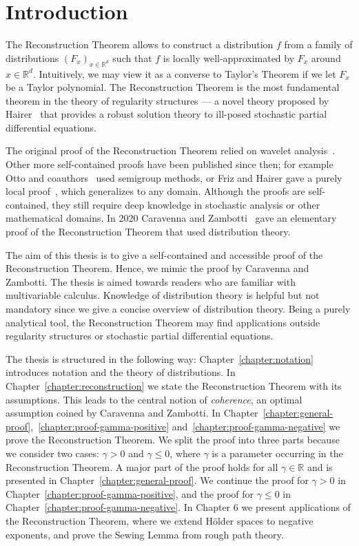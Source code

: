 \chapter{Introduction} 

The Reconstruction Theorem allows to construct a distribution \(f\) from a family of distributions \({(F_{x})}_{x \in \mathbb{R}^d}\) such that \(f\) is locally well-approximated by \(F_x\) around \(x \in \mathbb{R}^d\). Intuitively, we may view it as a converse to Taylor's Theorem if we let \(F_x\) be a Taylor polynomial. The Reconstruction Theorem is the most fundamental theorem in the theory of regularity structures --- a novel theory proposed by Hairer~\cite{hairer2014theory} that provides a robust solution theory to ill-posed stochastic partial differential equations.

The original proof of the Reconstruction Theorem relied on wavelet analysis~\cite{hairer2017reconstruction}. Other more self-contained proofs have been published since then; for example Otto and coauthors~\cite{otto2019quasilinear} used semigroup methods, or Friz and Hairer gave a purely local proof~\cite{friz2020course}, which generalizes to any domain. Although the proofs are self-contained, they still require deep knowledge in stochastic analysis or other mathematical domains. In 2020 Caravenna and Zambotti~\cite{caravenna2021hairer} gave an elementary proof of the Reconstruction Theorem that used distribution theory. 

The aim of this thesis is to give a self-contained and accessible proof of the Reconstruction Theorem. Hence, we mimic the proof by Caravenna and Zambotti. The thesis is aimed towards readers who are familiar with multivariable calculus. Knowledge of distribution theory is helpful but not mandatory since we give a concise overview of distribution theory.
Being a purely analytical tool, the Reconstruction Theorem may find applications outside regularity structures or stochastic partial differential equations. 

The thesis is structured in the following way: Chapter~\ref{chapter:notation} introduces notation and the theory of distributions. In Chapter~\ref{chapter:reconstruction} we state the Reconstruction Theorem with its assumptions. This leads to the central notion of \emph{coherence}, an optimal assumption coined by Caravenna and Zambotti. In Chapter~\ref{chapter:general-proof},~\ref{chapter:proof-gamma-positive} and~\ref{chapter:proof-gamma-negative} we prove the Reconstruction Theorem. We split the proof into three parts because we consider two cases: \(\gamma > 0\) and \(\gamma \leq 0\), where \({\gamma}\) is a parameter occurring in the Reconstruction Theorem. A major part of the proof holds for all \(\gamma \in \mathbb{R}\) and is presented in Chapter~\ref{chapter:general-proof}. We continue the proof for \(\gamma > 0\) in Chapter~\ref{chapter:proof-gamma-positive}, and the proof for \(\gamma \leq 0\) in Chapter~\ref{chapter:proof-gamma-negative}. In Chapter 6 we present applications of the Reconstruction Theorem, where we extend Hölder spaces to negative exponents, and prove the Sewing Lemma from rough path theory.

